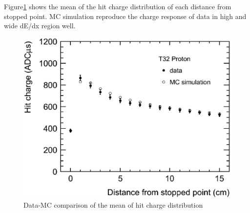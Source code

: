 Figure\ref{fig:Mean_comparison} shows the mean of the hit charge distribution of each distance from stopped point.
MC simulation reproduce the charge response of data in high and wide dE/dx region well.


\begin{figure}[htbp]
  \begin{center}
  \includegraphics[width=1.0\hsize,clip]{fig/stop_proton3.eps}
  \end{center}
  \caption{Data-MC comparison of the mean of hit charge distribution}
  \label{fig:Mean_comparison}
\end{figure}


